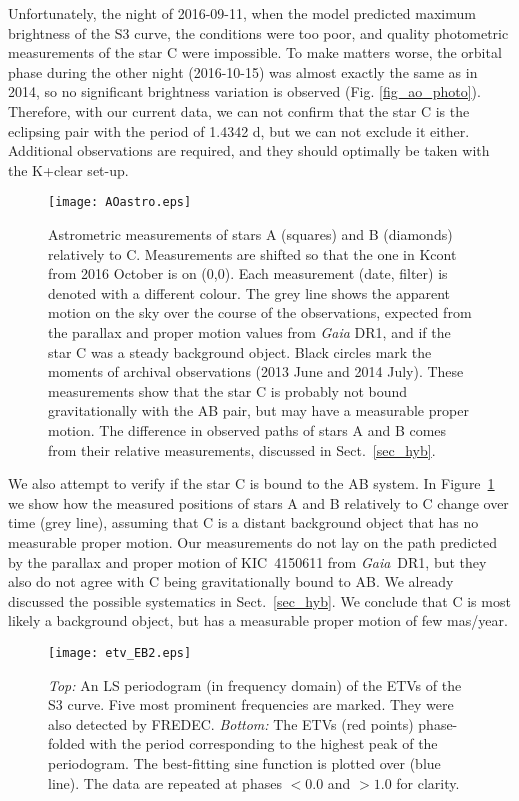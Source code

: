 \documentclass{aa}
\begin{document}
Unfortunately, the night of 2016-09-11, when
the model predicted maximum brightness of the S3 curve, the conditions were too 
poor, and quality photometric measurements of the star C were impossible.
To make matters worse, the orbital phase during the other night (2016-10-15) 
was almost exactly the same as in 2014, so no significant brightness 
variation is observed (Fig. \ref{fig_ao_photo}). Therefore, with our current 
data, we can not confirm that the star C is the eclipsing pair with the period
of 1.4342 d, but we can not exclude it either. Additional observations
are required, and they should optimally be taken with the K+clear set-up.

\begin{figure}
\centering
\texttt{[image: AOastro.eps]}
\caption{Astrometric measurements of stars A (squares) and B (diamonds)
relatively to C. Measurements are shifted so that the one in Kcont from 2016 October
is on (0,0). Each measurement (date, filter) is denoted with a different
colour. The grey line shows the apparent motion on the sky over the course
of the observations, expected from the parallax and proper motion values
from {\it Gaia} DR1, and if the star C was a steady background object.
Black circles mark the moments of archival observations (2013 June and
2014 July). These measurements show that the star C is probably not
bound gravitationally with the AB pair, but may have a measurable proper
motion. The difference in observed paths of stars A and B comes from their
relative measurements, discussed in Sect.~\ref{sec_hyb}.
}\label{fig_ao_astro}
\end{figure}

We also attempt to verify if the star C is bound to the AB system. In 
Figure~\ref{fig_ao_astro} we show how the measured positions of stars A and B
relatively to C change over time (grey line), assuming that C is a distant background object
that has no measurable proper motion. Our measurements do not lay on the path 
predicted by the parallax and proper motion of KIC~4150611 from {\it Gaia}~DR1,
but they also do not agree with C being gravitationally bound to AB. We already
discussed the possible systematics in Sect.~\ref{sec_hyb}. We conclude that C
is most likely a background object, but has a measurable proper motion of few mas/year.

\begin{figure}
\centering
\texttt{[image: etv\_EB2.eps]}
\caption{{\it Top:} An LS periodogram (in frequency domain) of the ETVs
of the S3 curve. Five most prominent frequencies are marked.
They were also detected by FREDEC.
{\it Bottom:} The ETVs (red points) phase-folded with the period corresponding
to the highest peak of the periodogram. The best-fitting sine function is plotted over 
(blue line). The data are repeated at phases $<0.0$ and $>1.0$ for clarity.
}\label{fig_etv_EB2}
\end{figure}
\end{document}

